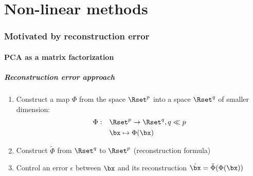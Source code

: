 \documentclass{beamer}\usepackage[]{graphicx}\usepackage[]{color}
\begin{document}
\part{Non-linear methods}
\begin{frame}
  \partpage
\end{frame}

\section{Motivated by reconstruction error}

\subsection{PCA as a matrix factorization}

\begin{frame}
  \frametitle{Reconstruction error approach}

  \begin{enumerate}
    \item  Construct a map $\Phi$ from the space $\Rset^{p}$ into a space $\Rset^{q}$ of \alert{smaller dimension}:
      \begin{align*}
      \Phi:\quad & \Rset^{p} \to \Rset^{q}, q \ll p\\
               & \bx \mapsto \Phi(\bx)
      \end{align*}
    \item Construct $\widetilde{\Phi}$ from $\Rset^{q}$ to $\Rset^{p}$ (\alert{reconstruction formula})
     \item Control an error $\epsilon$ between $\bx$ and its reconstruction $\hat \bx = \tilde{\Phi}(\Phi(\bx))$
  \end{enumerate}

\bigskip

\end{frame}
\end{document}
